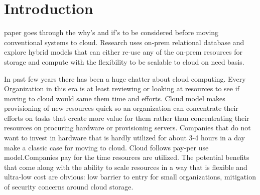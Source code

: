 \documentclass[journal]{hybrid-cloud}
\begin{document}

%
\IEEEpeerreviewmaketitle



\section{Introduction}
% 
% 
% 
% 
 paper goes through the why’s and if's to be considered
before moving conventional systems to cloud. Research uses on-prem relational database and explore hybrid models that can either re-use any of the on-prem resources for storage and compute with
the flexibility to be scalable to cloud on need basis.

In past few years there has been a huge chatter about cloud computing. Every
Organization in this era is at least reviewing or looking at resources to see if moving
to cloud would same them time and efforts. Cloud model makes provisioning
of new resources quick so an organization can concentrate their efforts on tasks that
create more value for them rather than concentrating their resources on procuring
hardware or provisioning servers. Companies that do not want to invest in hardware that is hardly utilized for about 3-4 hours in a day make a classic case for moving to cloud. Cloud follows pay-per use model.Companies pay for the time resources are utilized. The potential benefits that come along with the ability to scale resources in a way that is flexible and ultra-low cost are obvious: low barrier to entry
for small organizations, mitigation of security concerns around cloud storage.
\end{document}
